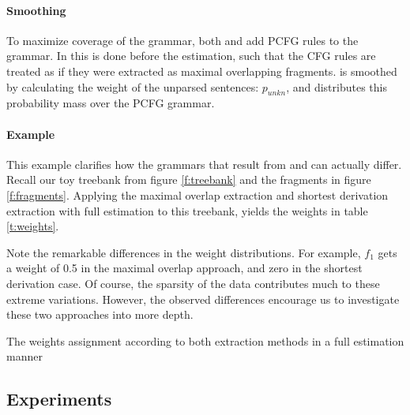 \paragraph{Smoothing}
To maximize coverage of the grammar, both \ddop{} and \dops{} add PCFG rules to the grammar. In \ddop{} this is done before the estimation, such that the CFG rules are treated as if they were extracted as maximal overlapping fragments. \dops{} is smoothed by calculating the weight of the unparsed sentences: $p_{unkn}$, and distributes this probability mass over the PCFG grammar.




\paragraph{Example}
\FloatBarrier
This example clarifies how the grammars that result from \ddop{} and \dops{} can actually differ. Recall our toy treebank from figure \ref{f:treebank} and the fragments in figure \ref{f:fragments}. 
Applying the maximal overlap extraction and shortest derivation extraction with full estimation to this treebank, yields the weights in table \ref{t:weights}.

Note the remarkable differences in the weight distributions. For example, $f_1$ gets a weight of 0.5 in the maximal overlap approach, and zero in the shortest derivation case. Of course, the sparsity of the data contributes much to these extreme variations. However, the observed differences encourage us to investigate these two approaches into more depth.


\begin{table}[h!]
\center

\caption{The weights assignment according to both extraction methods in a full estimation manner}
\label{t:weights}
\end{table}




\subsection{Experiments}

